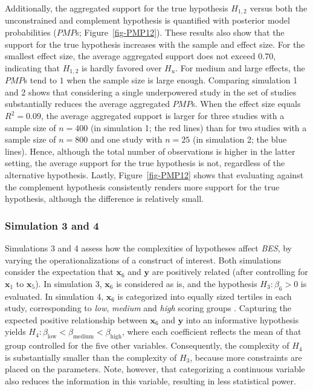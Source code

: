 \documentclass[
]{article}
\begin{document}
Additionally, the aggregated support for the true hypothesis \(H_{1,2}\)
versus both the unconstrained and complement hypothesis is quantified
with posterior model probabilities (\(PMP\)s; Figure~\ref{fig-PMP12}).
These results also show that the support for the true hypothesis
increases with the sample and effect size. For the smallest effect size,
the average aggregated support does not exceed \(0.70\), indicating that
\(H_{1,2}\) is hardly favored over \(H_u\). For medium and large
effects, the \(PMP\)s tend to \(1\) when the sample size is large
enough. Comparing simulation 1 and 2 shows that considering a single
underpowered study in the set of studies substantially reduces the
average aggregated \(PMP\)s. When the effect size equals \(R^2 = 0.09\),
the average aggregated support is larger for three studies with a sample
size of \(n = 400\) (in simulation 1; the red lines) than for two
studies with a sample size of \(n = 800\) and one study with \(n = 25\)
(in simulation 2; the blue lines). Hence, although the total number of
observations is higher in the latter setting, the average support for
the true hypothesis is not, regardless of the alternative hypothesis.
Lastly, Figure~\ref{fig-PMP12} shows that evaluating against the
complement hypothesis consistently renders more support for the true
hypothesis, although the difference is relatively small.

\hypertarget{simulation-3-and-4}{%
\subsubsection{Simulation 3 and 4}\label{simulation-3-and-4}}

Simulations 3 and 4 assess how the complexities of hypotheses affect
\emph{BES}, by varying the operationalizations of a construct of
interest. Both simulations consider the expectation that
\(\boldsymbol{x}_6\) and \(\boldsymbol{y}\) are positively related
(after controlling for \(\boldsymbol{x}_1\) to \(\boldsymbol{x}_5\)). In
simulation 3, \(\boldsymbol{x}_6\) is considered as is, and the
hypothesis \(H_3: \beta_6 > 0\) is evaluated. In simulation 4,
\(\boldsymbol{x}_6\) is categorized into equally sized tertiles in each
study, corresponding to \emph{low}, \emph{medium} and \emph{high}
scoring groups \citep[which is, despite advice against it, a common
procedure in many areas of research;
e.g.,][]{bennette_against_2012, decoster_best_2011}. Capturing the
expected positive relationship between \(\boldsymbol{x}_6\) and
\(\boldsymbol{y}\) into an informative hypothesis yields
\(H_4: \beta_{\text{low}} < \beta_{\text{medium}} < \beta_{\text{high}}\),
where each coefficient reflects the mean of that group controlled for
the five other variables. Consequently, the complexity of \(H_4\) is
substantially smaller than the complexity of \(H_3\), because more
constraints are placed on the parameters. Note, however, that
categorizing a continuous variable also reduces the information in this
variable, resulting in less statistical power.
\end{document}
